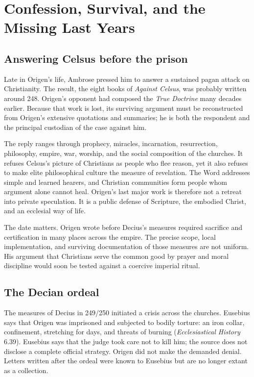 \section{Confession, Survival, and the Missing Last Years}
\label{sec:origen-death}

\subsection{Answering Celsus before the prison}

Late in Origen's life, Ambrose pressed him to answer a sustained pagan attack
on Christianity. The result, the eight books of \emph{Against Celsus}, was
probably written around 248. Origen's opponent had composed the \emph{True
Doctrine} many decades earlier. Because that work is lost, its surviving
argument must be reconstructed from Origen's extensive quotations and
summaries; he is both the respondent and the principal custodian of the case
against him.

The reply ranges through prophecy, miracles, incarnation, resurrection,
philosophy, empire, war, worship, and the social composition of the churches.
It refuses Celsus's picture of Christians as people who flee reason, yet it
also refuses to make elite philosophical culture the measure of revelation.
The Word addresses simple and learned hearers, and Christian communities form
people whom argument alone cannot heal. Origen's last major work is therefore
not a retreat into private speculation. It is a public defense of Scripture,
the embodied Christ, and an ecclesial way of life.

The date matters. Origen wrote before Decius's measures required sacrifice and
certification in many places across the empire. The precise scope, local
implementation, and surviving documentation of those measures are not uniform.
His argument that Christians serve the common good by prayer and moral
discipline would soon be tested against a coercive imperial ritual.

\subsection{The Decian ordeal}

The measures of Decius in 249/250 initiated a crisis across the churches. Eusebius
says that Origen was imprisoned and subjected to bodily torture: an iron
collar, confinement, stretching for days, and threats of burning
(\emph{Ecclesiastical History} 6.39). Eusebius says that the judge took care
not to kill him; the source does not disclose a complete official strategy.
Origen did not make the demanded denial. Letters written after the ordeal were
known to Eusebius but are no longer extant as a collection.


